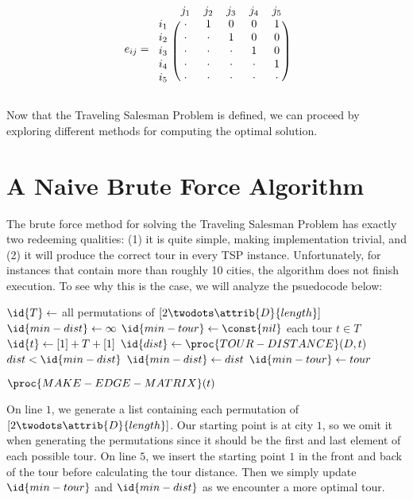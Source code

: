 \documentclass[11pt,fleqn]{article}
\begin{document}
\begin{align*}
  e_{ij}=
  \begin{blockarray}{cccccc}
    & j_1 & j_2 & j_3 & j_4 & j_5 \\
  \begin{block}{c(ccccc)}
    i_1 & \cdot & 1 & 0 & 0 & 1 \\
    i_2 & \cdot & \cdot & 1 & 0 & 0 \\
    i_3 & \cdot & \cdot & \cdot & 1 & 0 \\
    i_4 & \cdot & \cdot & \cdot & \cdot & 1 \\
    i_5 & \cdot & \cdot & \cdot & \cdot & \cdot \\
  \end{block}
  \end{blockarray}
\end{align*}

Now that the Traveling Salesman Problem is defined, we can proceed by
exploring different methods for computing the optimal solution.

\section{A Naive Brute Force Algorithm}
The brute force method for solving the Traveling Salesman Problem has exactly
two redeeming qualities: (1) it is quite simple, making implementation
trivial, and (2) it will produce the correct tour in every TSP instance.
Unfortunately, for instances that contain more than roughly 10 cities, the
algorithm does not finish execution.  To see why this is the case, we will
analyze the psuedocode below:
\par
\vspace{0.5cm}


\begin{codebox}
\li $\id{T} \gets$ all permutations of $[2 \twodots \attrib{D}{length}]$
\li $\id{min-dist} \gets \infty$
\li $\id{min-tour} \gets \const{nil}$
\li \For each tour $t \in T$
\li   \Do
        $\id{t} \gets [1] + T + [1]$
\li       $\id{dist} \gets \proc{TOUR-DISTANCE}(D, t)$
\li	  \If $dist < \id{min-dist}$
\li	    \Then
              $\id{min-dist} \gets dist$
\li	      $\id{min-tour} \gets tour$
            \End
       \End

\li   \Return $\proc{MAKE-EDGE-MATRIX}(t)$
\end{codebox}
\vspace{0.5cm}

On line $1$, we generate a list containing each permutation of
$[2 \twodots \attrib{D}{length}]$.  Our starting point is at city
$1$, so we omit it when generating the permutations since it should
be the first and last element of each possible tour.  On line $5$,
we insert the starting point $1$ in the front and back of the tour
before calculating the tour distance.  Then we simply update $\id{min-tour}$
and $\id{min-dist}$ as we encounter a more optimal tour.
\par
\end{document}
